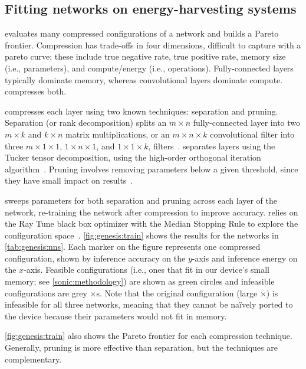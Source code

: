 \subsection{Fitting networks on energy-harvesting systems}

\genesis evaluates many compressed configurations of a 
network and builds a Pareto frontier.
%
Compression has trade-offs in four dimensions, difficult to capture with a pareto curve;
these include true negative rate, true positive rate, memory size (i.e.,
parameters), and compute/energy (i.e., operations).
%
Fully-connected layers typically dominate memory, whereas convolutional layers
dominate compute. \genesis compresses both.

\genesis compresses each layer using two known techniques: separation and pruning.
%
Separation (or rank decomposition) splits an $m \times n$
fully-connected layer into two $m \times k$ and $k \times n$ matrix
multiplications, or an $m \times n \times k$ convolutional filter into three $m
\times 1 \times 1$, $1 \times n \times 1$, and $1 \times 1 \times k$, 
filters~\cite{chollet2016xception, bhattacharya2016sparsification}.
%
\genesis separates layers using the Tucker tensor decomposition,
using the high-order orthogonal iteration algorithm~\cite{tucker1966some, de2000best, de2000multilinear}.
%
Pruning involves removing parameters below a given threshold, since
they have small impact on results~\cite{nabhan1994toward, han:iclr16:deep-compression}.

\genesis sweeps parameters for both separation and pruning across each layer of
the network, re-training the network after compression to improve
accuracy.
%
\genesis relies on the Ray Tune black box optimizer with the Median
Stopping Rule to explore the configuration space~\cite{golovin2017google, moritz2017ray}.
%
\autoref{fig:genesis:train} shows the results for the networks in
\autoref{tab:genesis:nns}.
%
Each marker on the figure represents one compressed configuration,
shown by inference accuracy on the $y$-axis and inference energy on
the $x$-axis.
%
Feasible configurations (i.e., ones that fit in our device's 
small memory; see \autoref{sonic:methodology}) are shown as green
circles and infeasible configurations are grey $\times$s.
%
Note that the original configuration (large $\times$) is infeasible for all three networks,
meaning that they cannot be na\"ively ported to the device because their parameters would not fit in memory.

\autoref{fig:genesis:train} also shows the Pareto frontier for each
compression technique.
%
Generally, pruning is more effective than separation, but the
techniques are complementary.

